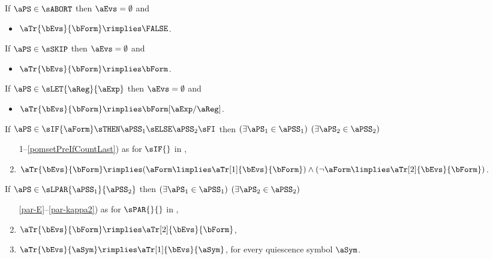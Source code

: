 \begin{definition}
  \label{def:pomsets-trans}

  \noindent
  If $\aPS\in\sABORT$ then $\aEvs = \emptyset$ and
  \begin{itemize}
  \item $\aTr{\bEvs}{\bForm} \rimplies \FALSE$.
  \end{itemize}

  \noindent
  If $\aPS\in\sSKIP$ then $\aEvs = \emptyset$ and
  \begin{itemize}
  \item $\aTr{\bEvs}{\bForm} \rimplies \bForm$.
  \end{itemize}

  \noindent
  If $\aPS\in\sLET{\aReg}{\aExp}$ then $\aEvs = \emptyset$ and
  \begin{itemize}
  \item $\aTr{\bEvs}{\bForm} \rimplies \bForm[\aExp/\aReg]$.
  \end{itemize}

  \noindent
  If $\aPS \in \sIF{\aForm}\sTHEN\aPSS_1\sELSE\aPSS_2\sFI$ then
  $(\exists\aPS_1\in\aPSS_1)$ $(\exists\aPS_2\in\aPSS_2)$
  \begin{enumerate}[topsep=0pt]
    \setcounter{enumi}{\value{pomsetPreIfCount}}
  \item[1--\ref{pomsetPreIfCountLast})] as for $\sIF{}$ in ,
  \item \label{if-tau}
    $\aTr{\bEvs}{\bForm} \rimplies (\aForm\limplies\aTr[1]{\bEvs}{\bForm})\land(\neg\aForm\limplies\aTr[2]{\bEvs}{\bForm})$.
  \end{enumerate}

  \noindent
  If $\aPS \in \sLPAR{\aPSS_1}{\aPSS_2}$ then
  $(\exists\aPS_1\in\aPSS_1)$ $(\exists\aPS_2\in\aPSS_2)$
  \begin{enumerate}[topsep=0pt]
    \setcounter{enumi}{\value{pomsetPreParCount}}
  \item[\ref{par-E}--\ref{par-kappa2})]
    as for $\sPAR{}{}$ in ,
  \item \label{par-tau1}
    $\aTr{\bEvs}{\bForm} \rimplies \aTr[2]{\bEvs}{\bForm}$,
  \item \label{par-tau2}
    $\aTr{\bEvs}{\aSym} \rimplies \aTr[1]{\bEvs}{\aSym}$,
    for every quiescence symbol $\aSym$.
  \end{enumerate}


\end{definition}
